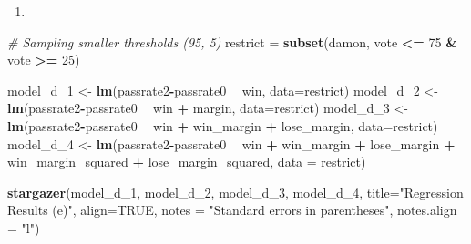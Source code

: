 \documentclass[
  12pt,
  landscape]{article}
\newenvironment{Shaded}{\begin{snugshade}}{\end{snugshade}}
\newcommand{\CommentTok}[1]{\textcolor[rgb]{0.56,0.35,0.01}{\textit{#1}}}
\newcommand{\DataTypeTok}[1]{\textcolor[rgb]{0.13,0.29,0.53}{#1}}
\newcommand{\DecValTok}[1]{\textcolor[rgb]{0.00,0.00,0.81}{#1}}
\newcommand{\KeywordTok}[1]{\textcolor[rgb]{0.13,0.29,0.53}{\textbf{#1}}}
\newcommand{\NormalTok}[1]{#1}
\newcommand{\OperatorTok}[1]{\textcolor[rgb]{0.81,0.36,0.00}{\textbf{#1}}}
\newcommand{\OtherTok}[1]{\textcolor[rgb]{0.56,0.35,0.01}{#1}}
\newcommand{\StringTok}[1]{\textcolor[rgb]{0.31,0.60,0.02}{#1}}
\begin{document}
\begin{enumerate}
\def\labelenumi{(\alph{enumi})}
\setcounter{enumi}{4}
\item
\end{enumerate}

\begin{Shaded}
\begin{Highlighting}[]
\CommentTok{# Sampling smaller thresholds (95, 5)}
\NormalTok{restrict =}\StringTok{ }\KeywordTok{subset}\NormalTok{(damon, vote }\OperatorTok{<=}\StringTok{ }\DecValTok{75} \OperatorTok{&}\StringTok{ }\NormalTok{vote }\OperatorTok{>=}\StringTok{ }\DecValTok{25}\NormalTok{)}

\NormalTok{model_d_}\DecValTok{1}\NormalTok{ <-}\StringTok{ }\KeywordTok{lm}\NormalTok{(passrate2}\OperatorTok{-}\NormalTok{passrate0 }\OperatorTok{~}\StringTok{ }\NormalTok{win, }\DataTypeTok{data=}\NormalTok{restrict)}
\NormalTok{model_d_}\DecValTok{2}\NormalTok{ <-}\StringTok{ }\KeywordTok{lm}\NormalTok{(passrate2}\OperatorTok{-}\NormalTok{passrate0 }\OperatorTok{~}\StringTok{ }\NormalTok{win }\OperatorTok{+}\StringTok{ }\NormalTok{margin, }\DataTypeTok{data=}\NormalTok{restrict)}
\NormalTok{model_d_}\DecValTok{3}\NormalTok{ <-}\StringTok{ }\KeywordTok{lm}\NormalTok{(passrate2}\OperatorTok{-}\NormalTok{passrate0 }\OperatorTok{~}\StringTok{ }\NormalTok{win }\OperatorTok{+}\StringTok{ }\NormalTok{win_margin }\OperatorTok{+}\StringTok{ }\NormalTok{lose_margin, }\DataTypeTok{data=}\NormalTok{restrict)}
\NormalTok{model_d_}\DecValTok{4}\NormalTok{ <-}\StringTok{ }\KeywordTok{lm}\NormalTok{(passrate2}\OperatorTok{-}\NormalTok{passrate0 }\OperatorTok{~}\StringTok{ }\NormalTok{win }\OperatorTok{+}\StringTok{ }\NormalTok{win_margin }\OperatorTok{+}\StringTok{ }\NormalTok{lose_margin }\OperatorTok{+}\StringTok{ }\NormalTok{win_margin_squared }\OperatorTok{+}\StringTok{ }\NormalTok{lose_margin_squared, }\DataTypeTok{data =}\NormalTok{ restrict)}

\KeywordTok{stargazer}\NormalTok{(model_d_}\DecValTok{1}\NormalTok{, model_d_}\DecValTok{2}\NormalTok{, model_d_}\DecValTok{3}\NormalTok{, model_d_}\DecValTok{4}\NormalTok{, }\DataTypeTok{title=}\StringTok{"Regression Results (e)"}\NormalTok{, }\DataTypeTok{align=}\OtherTok{TRUE}\NormalTok{, }\DataTypeTok{notes =} \StringTok{"Standard errors in parentheses"}\NormalTok{, }\DataTypeTok{notes.align =} \StringTok{"l"}\NormalTok{)}
\end{Highlighting}
\end{Shaded}
\end{document}
